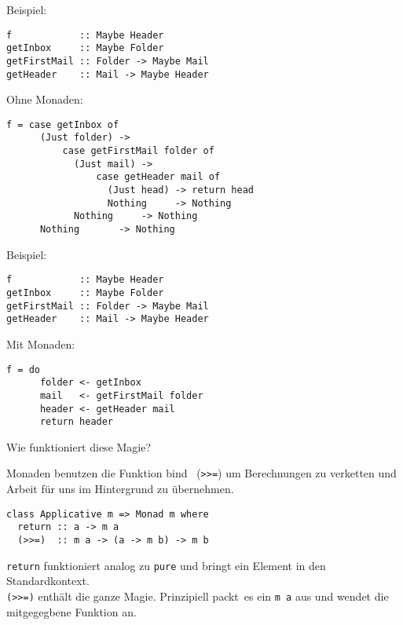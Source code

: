 \documentclass{beamer}
\begin{document}
\begin{frame}[fragile]
Beispiel: \smallskip

\begin{verbatim}
f            :: Maybe Header
getInbox     :: Maybe Folder
getFirstMail :: Folder -> Maybe Mail
getHeader    :: Mail -> Maybe Header
\end{verbatim}
\pause
\bigskip

Ohne Monaden:
\begin{verbatim}
f = case getInbox of
      (Just folder) -> 
          case getFirstMail folder of
            (Just mail) -> 
                case getHeader mail of
                  (Just head) -> return head
                  Nothing     -> Nothing
            Nothing     -> Nothing
      Nothing       -> Nothing
\end{verbatim}
\end{frame}
\begin{frame}[fragile]
Beispiel: \smallskip

\begin{verbatim}
f            :: Maybe Header
getInbox     :: Maybe Folder
getFirstMail :: Folder -> Maybe Mail
getHeader    :: Mail -> Maybe Header
\end{verbatim}
\bigskip

Mit Monaden:
\begin{verbatim}
f = do
      folder <- getInbox
      mail   <- getFirstMail folder
      header <- getHeader mail
      return header
\end{verbatim}

\end{frame}

\begin{frame}[fragile]
Wie funktioniert diese Magie?\smallskip

\pause
Monaden benutzen die Funktion \glqq bind \grqq \ (\texttt{>>=}) um Berechnungen zu verketten und Arbeit für uns im Hintergrund zu übernehmen.\\
\pause
\begin{verbatim}
class Applicative m => Monad m where
  return :: a -> m a
  (>>=)  :: m a -> (a -> m b) -> m b
\end{verbatim}
\pause
\texttt{return} funktioniert analog zu \texttt{pure} und bringt ein Element in den Standardkontext.\\
\texttt{(>>=)} enthält die ganze Magie. Prinzipiell \glqq packt\grqq \ es ein \texttt{m a} aus und wendet die mitgegegbene Funktion an.
\end{frame}
\end{document}
